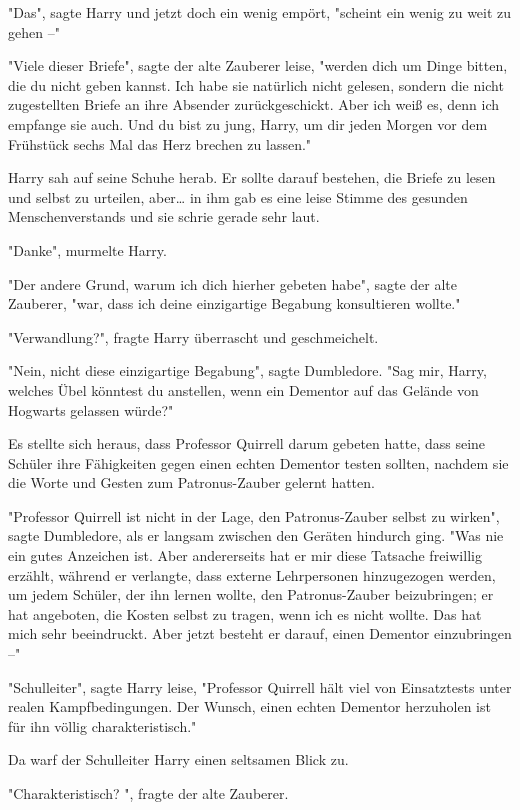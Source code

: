 {"Das", sagte Harry und jetzt doch ein wenig empört, "scheint ein wenig zu weit zu gehen --"

"Viele dieser Briefe", sagte der alte Zauberer leise, "werden dich um Dinge bitten, die du nicht geben kannst. Ich habe sie natürlich nicht gelesen, sondern die nicht zugestellten Briefe an ihre Absender zurückgeschickt. Aber ich weiß es, denn ich empfange sie auch. Und du bist zu jung, Harry, um dir jeden Morgen vor dem Frühstück sechs Mal das Herz brechen zu lassen."

Harry sah auf seine Schuhe herab. Er sollte darauf bestehen, die Briefe zu lesen und selbst zu urteilen, aber… in ihm gab es eine leise Stimme des gesunden Menschenverstands und sie schrie gerade sehr laut.

"Danke", murmelte Harry.

"Der andere Grund, warum ich dich hierher gebeten habe", sagte der alte Zauberer, "war, dass ich deine einzigartige Begabung konsultieren wollte."

"Verwandlung?", fragte Harry überrascht und geschmeichelt.

"Nein, nicht diese einzigartige Begabung", sagte Dumbledore. "Sag mir, Harry, welches Übel könntest du anstellen, wenn ein Dementor auf das Gelände von Hogwarts gelassen würde?"

Es stellte sich heraus, dass Professor Quirrell darum gebeten hatte, dass seine Schüler ihre Fähigkeiten gegen einen echten Dementor testen sollten, nachdem sie die Worte und Gesten zum Patronus-Zauber gelernt hatten.

"Professor Quirrell ist nicht in der Lage, den Patronus-Zauber selbst zu wirken", sagte Dumbledore, als er langsam zwischen den Geräten hindurch ging. "Was nie ein gutes Anzeichen ist. Aber andererseits hat er mir diese Tatsache freiwillig erzählt, während er verlangte, dass externe Lehrpersonen hinzugezogen werden, um jedem Schüler, der ihn lernen wollte, den Patronus-Zauber beizubringen; er hat angeboten, die Kosten selbst zu tragen, wenn ich es nicht wollte. Das hat mich sehr beeindruckt. Aber jetzt besteht er darauf, einen Dementor einzubringen --"

"Schulleiter", sagte Harry leise, "Professor Quirrell hält viel von Einsatztests unter realen Kampfbedingungen. Der Wunsch, einen echten Dementor herzuholen ist für ihn völlig charakteristisch."

Da warf der Schulleiter Harry einen seltsamen Blick zu.

"Charakteristisch? ", fragte der alte Zauberer.

}
